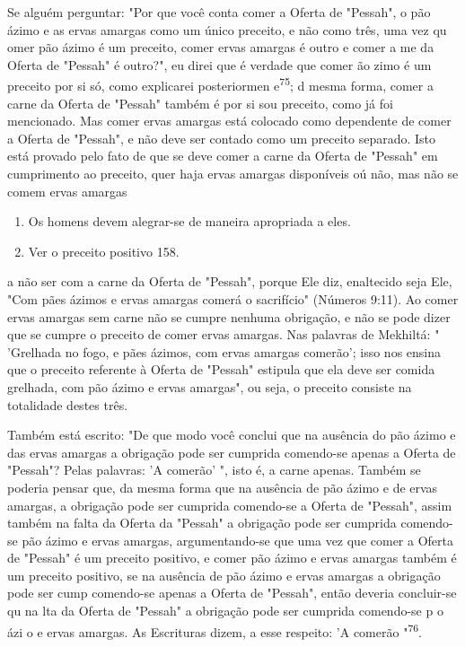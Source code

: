 \begin{itemize}
\begin{enumrate}
\begin{itemize}
\begin{itemize}
Se alguém perguntar: "Por que você conta comer a Oferta de "Pes­sah", o
pão ázimo e as ervas amargas como um único preceito, e não como três,
uma vez qu omer pão ázimo é um preceito, comer ervas amargas é ou­tro e
comer a me da Oferta de "Pessah" é outro?", eu direi que é verdade que
comer ão zimo é um preceito por si só, como explicarei posteriormen
e\textsuperscript{75}; d mesma forma, comer a carne da Oferta de
"Pessah" tam­bém é por si sou preceito, como já foi mencionado. Mas
comer ervas amar­gas está colocado como dependente de comer a Oferta de
"Pessah", e não de­ve ser contado como um preceito separado. Isto está
provado pelo fato de que se deve comer a carne da Oferta de "Pessah" em
cumprimento ao preceito, quer haja ervas amargas disponíveis oú não, mas
não se comem ervas amargas


\begin{enumerate}
\def\labelenumi{\arabic{enumi}.}
\setcounter{enumi}{73}
\item
 
 Os homens devem alegrar-se de maneira apropriada a eles.
 
\item
 
 Ver o preceito positivo 158.
 
\end{enumerate}

a não ser com a carne da Oferta de "Pessah", porque Ele diz, enaltecido
seja Ele, "Com pães ázimos e ervas amargas comerá o sacrifício" (Números
9:11). Ao comer ervas amargas sem carne não se cumpre nenhuma obrigação,
e não se pode dizer que se cumpre o preceito de comer ervas amargas. Nas
palavras de Mekhiltá: " 'Grelhada no fogo, e pães ázimos, com ervas
amargas comerão'; isso nos ensina que o preceito referente à Oferta de
"Pessah" estipula que ela deve ser comida grelhada, com pão ázimo e
ervas amargas", ou seja, o preceito consiste na totalidade destes três.

Também está escrito: "De que modo você conclui que na ausência do pão
ázimo e das ervas amargas a obrigação pode ser cumprida comendo-se
apenas a Oferta de "Pessah"? Pelas palavras: 'A comerão' ", isto é, a
carne ape­nas. Também se poderia pensar que, da mesma forma que na
ausência de pão ázimo e de ervas amargas, a obrigação pode ser cumprida
comendo-se a Oferta de "Pessah", assim também na falta da Oferta da
"Pessah" a obrigação pode ser cumprida comendo-se pão ázimo e ervas
amargas, argumentando-se que uma vez que comer a Oferta de "Pessah" é um
preceito positivo, e comer pão ázi­mo e ervas amargas também é um
preceito positivo, se na ausência de pão ázi­mo e ervas amargas a
obrigação pode ser cump comendo-se apenas a Ofer­ta de "Pessah", então
deveria concluir-se qu na lta da Oferta de "Pessah" a obrigação pode ser
cumprida comendo-se p o ázi o e ervas amargas. As Es­crituras dizem, a
esse respeito: 'A comerão "\textsuperscript{76}.


\end{itemize}
\end{itemize}
\end{enumrate}
\end{itemize}
